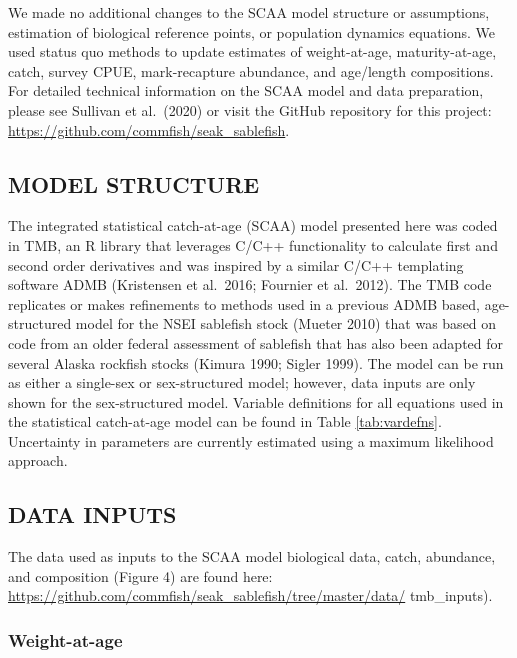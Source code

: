 \documentclass[
]{article}
\begin{document}
We made no additional changes to the SCAA model structure or assumptions, estimation of biological reference points, or population dynamics equations. We used status quo methods to update estimates of weight-at-age, maturity-at-age, catch, survey CPUE, mark-recapture abundance, and age/length compositions. For detailed technical information on the SCAA model and data preparation, please see Sullivan et al.~(2020) or visit the GitHub repository for this project: \url{https://github.com/commfish/seak_sablefish}.

\hypertarget{model-structure}{%
\subsection{MODEL STRUCTURE}\label{model-structure}}

The integrated statistical catch-at-age (SCAA) model presented here was coded in TMB, an R library that leverages C/C++ functionality to calculate first and second order derivatives and was inspired by a similar C/C++ templating software ADMB (Kristensen et al.~2016; Fournier et al.~2012). The TMB code replicates or makes refinements to methods used in a previous ADMB based, age-structured model for the NSEI sablefish stock (Mueter 2010) that was based on code from an older federal assessment of sablefish that has also been adapted for several Alaska rockfish stocks (Kimura 1990; Sigler 1999). The model can be run as either a single-sex or sex-structured model; however, data inputs are only shown for the sex-structured model. Variable definitions for all equations used in the statistical catch-at-age model can be found in Table \ref{tab:vardefns}. Uncertainty in parameters are currently estimated using a maximum likelihood approach.

\hypertarget{data-inputs}{%
\subsection{DATA INPUTS}\label{data-inputs}}

The data used as inputs to the SCAA model biological data, catch, abundance, and composition (Figure 4) are found here: \url{https://github.com/commfish/seak_sablefish/tree/master/data/} tmb\_inputs).

\hypertarget{weight-at-age}{%
\subsubsection{Weight-at-age}\label{weight-at-age}}
\end{document}
